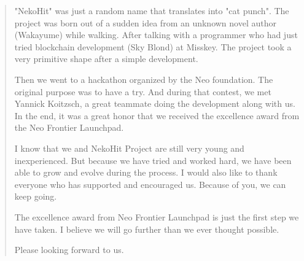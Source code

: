 \documentclass[12pt,a4paper]{article}
\begin{document}
    \begin{quotation}
        "NekoHit" was just a random name that translates into "cat punch".
        The project was born out of a sudden idea from an unknown novel author
        (Wakayume) while walking.
        After talking with a programmer who had just tried blockchain development
        (Sky Blond) at Misskey.
        The project took a very primitive shape after a simple development.

        Then we went to a hackathon organized by the Neo foundation.
        The original purpose was to have a try.
        And during that contest, we met Yannick Koitzsch, a great teammate doing
        the development along with us.
        In the end, it was a great honor that we received the excellence award
        from the Neo Frontier Launchpad.

        I know that we and NekoHit Project are still very young and inexperienced.
        But because we have tried and worked hard, we have been able to grow and
        evolve during the process.
        I would also like to thank everyone who has supported and encouraged us.
        Because of you, we can keep going.

        The excellence award from Neo Frontier Launchpad is just the first step
        we have taken.
        I believe we will go further than we ever thought possible.

        Please looking forward to us.

    \end{quotation}

    \clearpage

    
    
\end{document}
